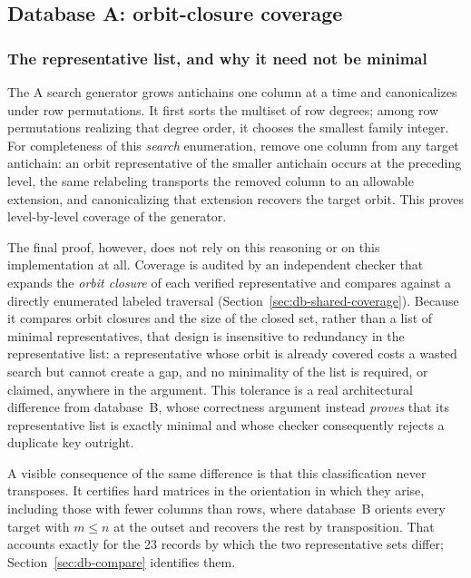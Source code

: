 \documentclass[11pt,letterpaper]{article}
\numberwithin{equation}{section}
\theoremstyle{definition}
\theoremstyle{remark}
\newcommand{\dbA}{\textsf{A}}
\newcommand{\dbB}{\textsf{B}}
\begin{document}
\subsection{Database \dbA{}: orbit-closure coverage}
\label{sec:db-shared}

\subsubsection{The representative list, and why it need not be minimal}
The \dbA{} search generator grows antichains one column at a time and
canonicalizes under row permutations. It first sorts the multiset of row
degrees; among row permutations realizing that degree order, it chooses the
smallest family integer. For completeness of this \emph{search} enumeration,
remove one column from any target antichain: an orbit representative of the
smaller antichain occurs at the preceding level, the same relabeling
transports the removed column to an allowable extension, and canonicalizing
that extension recovers the target orbit. This proves level-by-level coverage
of the generator.

The final proof, however, does not rely on this reasoning or on this
implementation at all. Coverage is audited by an independent checker that
expands the \emph{orbit closure} of each verified representative and compares
against a directly enumerated labeled traversal
(Section~\ref{sec:db-shared-coverage}). Because it compares orbit closures and
the size of the closed set, rather than a list of minimal representatives,
that design is insensitive to redundancy in the representative list: a
representative whose orbit is already covered costs a wasted search but cannot
create a gap, and no minimality of the list is required, or claimed, anywhere
in the argument. This tolerance is a real architectural difference from
database~\dbB{}, whose correctness argument instead \emph{proves} that its
representative list is exactly minimal and whose checker consequently rejects
a duplicate key outright.

A visible consequence of the same difference is that this classification never
transposes. It certifies hard matrices in the orientation in which they arise,
including those with fewer columns than rows, where database~\dbB{} orients
every target with $m\le n$ at the outset and recovers the rest by
transposition. That accounts exactly for the 23 records by which the two
representative sets differ; Section~\ref{sec:db-compare} identifies them.
\end{document}
